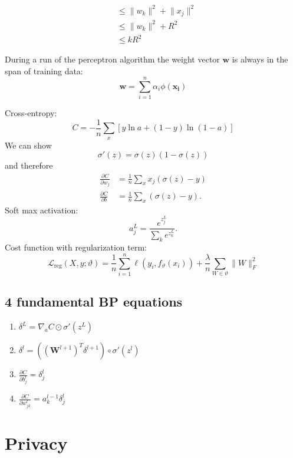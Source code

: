 \documentclass[a4paper,9pt]{extarticle}
\begin{document}
\begin{multicols*}{2}
\begin{align*}
	&\leq\lVert w_{k}\rVert^{2}+\lVert x_{j}\rVert^{2}\\
	&\leq\lVert w_{k}\rVert^{2}+R^{2}\\
	&\leq k{R}^{2}
\end{align*}
\begin{riquadro}
	During a run of the perceptron algorithm the weight vector $\bm{w}$ is always in the span of training data:
	\begin{equation*}
		\bm{w}=\sum_{i=1}^{n}\alpha_{i}\phi(\bm{x_{i}})
	\end{equation*}
\end{riquadro}
Cross-entropy: 
\begin{equation*}
	C=-\frac{1}{n}\sum_{x}\left[y\ln a+(1-y)\ln(1-a)\right]
\end{equation*}
We can show
\begin{equation*}
	\sigma'(z)=\sigma(z)(1-\sigma(z))
\end{equation*}
and therefore
\begin{align*}
	\frac{\partial C}{\partial w_{j}}&=\frac{1}{n}\sum_{x}x_{j}(\sigma(z)-y)\\
	\frac{\partial C}{\partial b}&=\frac{1}{n}\sum_{x}(\sigma(z)-y).
\end{align*}
Soft max activation:
\begin{equation*}
	a^{L}_{j}=\frac{e^{z_{j}^{L}}}{\sum_{k}e^{z_{k}^{L}}}.
\end{equation*}
Cost function with regularization term:
\begin{equation*}
	\mathcal{L}_{\text{reg}}(X,y;\vartheta)=\frac{1}{n}\sum_{i=1}^{n}\ell(y_{i},f_{\vartheta}(x_{i}))+\frac{\lambda}{n}\sum_{W\in\vartheta}\lVert W\rVert^{2}_{F}
\end{equation*}
\subsection{4 fundamental BP equations}
\begin{enumerate}
	\item $\delta^{L}=\nabla_{a}C\odot\sigma'(z^{L})$
	\item $\delta^{l}=((\mathbf{W}^{l+1})^{T}\delta^{l+1})\circ\sigma'(z^{l})$
	\item $\frac{\partial C}{\partial b_{j}^{l}}=\delta^{l}_{j}$
	\item $\frac{\partial C}{\partial w^{l}_{jk}}=a^{l-1}_{k}\delta^{l}_{j}$
\end{enumerate}
\section{Privacy}

\end{multicols*}
\end{document}
